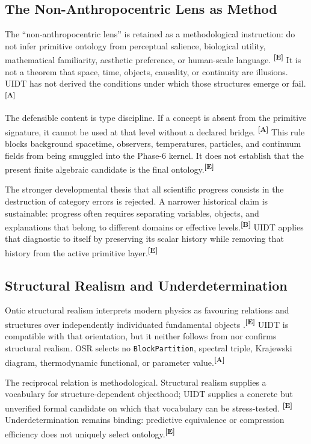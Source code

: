 \documentclass[12pt,a4paper,twoside]{article}
\theoremstyle{plain}
\theoremstyle{definition}
\theoremstyle{remark}
\newcommand{\catmark}[1]{\textsuperscript{\textsf{\textbf{[#1]}}}}
\begin{document}
\subsection{The Non-Anthropocentric Lens as Method}
\label{subsec:ctx-nonanthropocentric-method}

The ``non-anthropocentric lens'' is retained as a methodological instruction:
do not infer primitive ontology from perceptual salience, biological utility,
mathematical familiarity, aesthetic preference, or human-scale language.
\catmark{E} It is not a theorem that space, time, objects, causality, or
continuity are illusions. UIDT has not derived the conditions under which those
structures emerge or fail.\catmark{A}

The defensible content is type discipline. If a concept is absent from the
primitive signature, it cannot be used at that level without a declared bridge.
\catmark{A} This rule blocks background spacetime, observers, temperatures,
particles, and continuum fields from being smuggled into the Phase-6 kernel. It
does not establish that the present finite algebraic candidate is the final
ontology.\catmark{E}

The stronger developmental thesis that all scientific progress consists in the
destruction of category errors is rejected. A narrower historical claim is
sustainable: progress often requires separating variables, objects, and
explanations that belong to different domains or effective levels.\catmark{B}
UIDT applies that diagnostic to itself by preserving its scalar history while
removing that history from the active primitive layer.\catmark{E}

\subsection{Structural Realism and Underdetermination}
\label{subsec:ctx-structural-realism}

Ontic structural realism interprets modern physics as favouring relations and
structures over independently individuated fundamental objects
\cite{frenchladyman2003,ladymanross2007}.\catmark{E} UIDT is compatible with
that orientation, but it neither follows from nor confirms structural realism.
OSR selects no \texttt{BlockPartition}, spectral triple, Krajewski diagram,
thermodynamic functional, or parameter value.\catmark{A}

The reciprocal relation is methodological. Structural realism supplies a
vocabulary for structure-dependent objecthood; UIDT supplies a concrete but
unverified formal candidate on which that vocabulary can be stress-tested.
\catmark{E} Underdetermination remains binding: predictive equivalence or
compression efficiency does not uniquely select ontology.\catmark{E}
\end{document}
